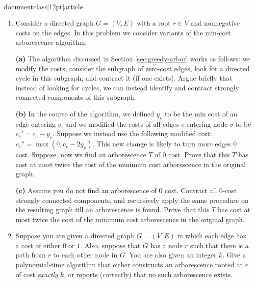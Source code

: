 \\documentclass[12pt]{article}
\begin{document}
\begin{enumerate}
\item 

Consider a directed graph $G=(V,E)$ with a root $r \in V$ and
nonnegative costs on the edges. In this problem we consider variants of the
min-cost arborescence algorithm.

{\bf (a)} The algorithm discussed in Section \ref{sec:greedy-arbor}
works as follows: we modify the costs, consider the subgraph of zero-cost edges, look for a directed cycle in this
subgraph, and contract it (if one exists). Argue briefly that instead of looking for cycles, we can instead identify and contract strongly connected components of this subgraph.

{\bf (b)} In the course of the algorithm,
we defined $y_v$ to be the min cost of an edge entering $v$,
and we modified the costs of all edges $e$ 
entering node $v$ to be $c_e'=c_e-y_v$.
Suppose we instead use the following modified cost: $c_e''=\max(0,c_e-2y_v)$.
This new change is likely to turn more edges 0 cost. Suppose, now we find
an arborescence $T$ of  0 cost. Prove that this $T$ has cost at most twice
the cost of the minimum cost arborescence in the original graph.

{\bf (c)\Star} Assume you do not
find an arborescence of 0 cost. Contract all 0-cost strongly connected
components, and recursively apply the same procedure on the resulting graph
till an arborescence is found.  Prove that this $T$ has cost at most twice
the cost of the minimum cost arborescence in the original graph.


\item\Star
Suppose you are given a directed graph $G = (V,E)$
in which each edge has a cost of either $0$ or $1$.
Also, suppose that $G$ has a node $r$ such that
there is a path from $r$ to each other node in $G$.
You are also given an integer $k$.
Give a polynomial-time algorithm that
either constructs an arborescence rooted at $r$ of cost {\em exactly} $k$,
or reports (correctly) that no such arborescence exists.

\end{enumerate}
\end{document}
